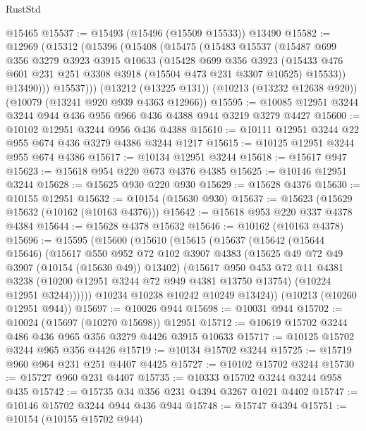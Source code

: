 \begin{lexlean}{RustStd}
\begin{coremodule}
    @15465
@15537 := @15493 (@15496 (@15509 @15533)) @13490
@15582 := @12969
    (@15312
      (@15396
        (@15408
          (@15475
            (@15483
              @15537
              (@15487
                @699
                @356
                @3279
                @3923
                @3915
                @10633
                (@15428
                  @699
                  @356
                  @3923
                  (@15433 @476 @601 @231 @251 @3308 @3918 (@15504 @473 @231 @3307 @10525) @15533))
                @13490)))
          @15537)))
    (@13212 (@13225 @131))
    (@10213 (@13232 @12638 @920))
    (@10079 (@13241 @920 @939 @4363 @12966))
@15595 := @10085 @12951 @3244 @3244 @944 @436 @956 @966 @436 @4388 @944 @3219 @3279 @4427
@15600 := @10102 @12951 @3244 @956 @436 @4388
@15610 := @10111 @12951 @3244 @22 @955 @674 @436 @3279 @4386 @3244 @1217
@15615 := @10125 @12951 @3244 @955 @674 @4386
@15617 := @10134 @12951 @3244
@15618 := @15617 @947
@15623 := @15618 @954 @220 @673 @4376 @4385
@15625 := @10146 @12951 @3244
@15628 := @15625 @930 @220 @930
@15629 := @15628 @4376
@15630 := @10155 @12951
@15632 := @10154 (@15630 @930)
@15637 := @15623 (@15629 @15632 (@10162 (@10163 @4376)))
@15642 := @15618 @953 @220 @337 @4378 @4384
@15644 := @15628 @4378 @15632
@15646 := @10162 (@10163 @4378)
@15696 := @15595
    (@15600
      (@15610
        (@15615
          (@15637
            (@15642
              (@15644 @15646)
              (@15617
                @550
                @952
                @72
                @102
                @3907
                @4383
                (@15625 @49 @72 @49 @3907 (@10154 (@15630 @49)) @13402)
                (@15617
                  @950
                  @453
                  @72
                  @11
                  @4381
                  @3238
                  (@10200 @12951 @3244 @72 @949 @4381 @13750 @13754)
                  (@10224 @12951 @3244))))))
        @10234
        @10238
        @10242
        @10249
        @13424))
    (@10213 (@10260 @12951 @944))
@15697 := @10026 @944
@15698 := @10031 @944
@15702 := @10024 (@15697 (@10270 @15698)) @12951
@15712 := @10619 @15702 @3244 @486 @436 @965 @356 @3279 @4426 @3915 @10633
@15717 := @10125 @15702 @3244 @965 @356 @4426
@15719 := @10134 @15702 @3244
@15725 := @15719 @960 @964 @231 @251 @4407 @4425
@15727 := @10102 @15702 @3244
@15730 := @15727 @960 @231 @4407
@15735 := @10333 @15702 @3244 @3244 @958 @435
@15742 := @15735 @34 @356 @231 @4394 @3267 @1021 @4402
@15747 := @10146 @15702 @3244 @944 @436 @944
@15748 := @15747 @4394
@15751 := @10154 (@10155 @15702 @944)

\end{coremodule}
\end{lexlean}
